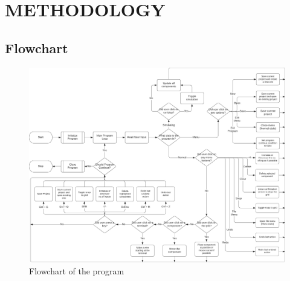 \documentclass[report.tex]{subfiles}
\begin{document}
    \section{METHODOLOGY}
    \subsection{Flowchart}
    \begin{figure}[H]
        \centering
        \includegraphics[width=\textwidth]{graphics/Flowchart.png}
        \caption{Flowchart of the program}
    \end{figure}
\end{document}
